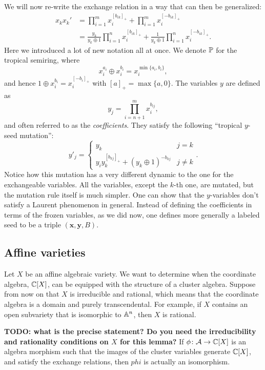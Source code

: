 \documentclass{article}
\begin{document}
We will now re-write the exchange relation in a way that can then be generalized:
\begin{align*}
	x_k x_k'
	 & = \prod_{i=1}^m x_i^{[b_{ik}]_+} + \prod_{i = 1}^m x_i^{[-b_{ik}]_+}                                                 \\
	 & = \frac{y_k}{y_k \oplus 1}\prod_{i=1}^n x_i^{[b_{ik}]_+} + \frac{1}{y_k \oplus 1} \prod_{i = 1}^n x_i^{[-b_{ik}]_+}.
\end{align*}
Here we introduced a lot of new notation all at once. We denote $\mathbb{P}$ for the tropical semiring,
where
\begin{equation*}
	x_i^{a_i} \oplus x_i^{b_i} = x_i^{\min\{a_i, b_i\}},
\end{equation*}
and hence $1 \oplus x_i^{b_i} = x_i^{[-b_i]_+}$ with $[a]_+ = \max \{a, 0\}$.
The variables $y$ are defined as
\begin{equation*}
	y_j = \prod_{i = n + 1}^m x_i^{b_{ij}},
\end{equation*}
and often referred to as the \emph{coefficients}.
They satisfy the following ``tropical $y$-seed mutation'':
\begin{equation*}
	y'_j =
	\begin{cases}
		y_k                                            & j = k   \\
		y_iy_k^{[b_{kj}]_+} + (y_k \oplus 1)^{-b_{kj}} & j\neq k
	\end{cases}.
\end{equation*}
Notice how this mutation has a very different dynamic to the one for the exchangeable variables.
All the variables, except the $k$-th one, are mutated, but the mutation rule itself is much simpler.
One can show that the $y$-variables don't satisfy a Laurent phenomenon in general.
Instead of defining the coefficients in terms of the frozen variables, as we did now,
one defines more generally a labeled seed to be a triple $(\mathbf{x}, \mathbf{y}, B)$.

\subsection{Affine varieties}

Let $X$ be an affine algebraic variety. We want to determine when the coordinate
algebra, $\mathbb{C}[X]$, can be equipped with the structure of a cluster algebra. Suppose
from now on that $X$ is irreducible and rational, which means that the coordinate
algebra is a domain and purely transcendental. For example, if $X$ contains an open
subvariety that is isomorphic to $\mathbb{A}^n$, then $X$ is rational.
\begin{lemma}
	\textbf{TODO: what is the precise statement?
		Do you need the irreducibility and rationality conditions on $X$ for this lemma?}
	If $\phi \colon \mathcal{A} \to \mathbb{C}[X]$ is an algebra morphism such that the images
	of the cluster variables generate $\mathbb{C}[X]$, and satisfy the exchange relations, then
	$phi$ is actually an isomorphism.
\end{lemma}
\end{document}
